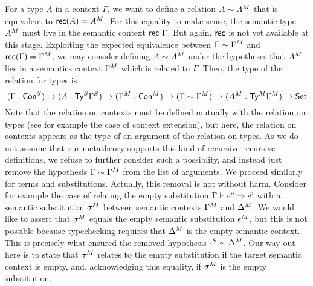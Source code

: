 For a type $A$ in a context $\Gamma$, we want to define a relation
$A\sim {A}^M$ that is equivalent to $\mathsf{rec}(A)={A}^M$.
For this equality to make sense, the semantic type ${A}^M$ must live
in the semantic context $\mathsf{rec}\ \Gamma$. But again, $\mathsf{rec}$ is not
yet available at this stage. Exploiting the expected equivalence between
$\Gamma\sim{\Gamma}^M$ and $\mathsf{rec}(\Gamma)={\Gamma}^M$, we may consider defining $A\sim{A}^M$ under the
hypotheses that ${A}^M$ lies in a semantics context ${\Gamma}^M$ which is
related to $\Gamma$. Then, the type of the relation for types is
\[
  (\Gamma : {\mathsf{Con}}^S)\rightarrow (A : {\mathsf{Ty}}^S{\Gamma}^S) \rightarrow
  ({\Gamma}^M : {\mathsf{Con}}^M)
  \rightarrow
  (\Gamma \sim {\Gamma}^M)
  \rightarrow
  ({A}^M:{\mathsf{Ty}}^M{\Gamma}^M)
  \rightarrow
  \mathsf{Set}
\]
Note that the relation on contexts
must be defined mutually with the relation on types (see for example the case of
context extension), but here, the relation on contexts appears as the type of an
argument of the relation on types.
As we do not assume that our metatheory
supports this kind of recursive-recursive definitions, we refuse to further consider
 such a possiblity, and instead just remove the 
hypothesis $\Gamma\sim{\Gamma}^M$ from the list of arguments.
We proceed similarly for terms and substitutions. Actually, 
this removal is not without harm. Consider for example the case of relating the
empty substitution $\Gamma\vdash {\epsilon}^p \Rightarrow {\cdot}^p $
with a semantic substitution ${\sigma}^M$ between semantic contexts
${\Gamma}^M$ and ${\Delta}^M$. We would like to assert that ${\sigma}^M$
equals the empty semantic substitution ${\epsilon}^M$, but this is not
possible because typechecking requires that ${\Delta}^M$ is 
the empty semantic context. This is precisely what ensured the removed hypothesis
${\cdot}^S \sim {\Delta}^M$.
Our way out here is to state that ${\sigma}^M$ relates to the empty
substitution if the target semantic context is empty, and, acknowledging
this equality, if ${\sigma}^M$ is
the empty substitution.

